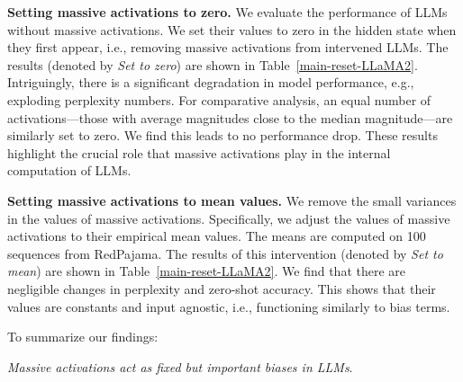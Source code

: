 \documentclass[10pt]{article}
\begin{document}
\textbf{Setting massive activations to zero.} We evaluate the performance of LLMs without massive activations. We set their values to zero in the hidden state when they first appear, i.e., removing massive activations from intervened LLMs. The results (denoted by \textit{Set to zero}) are shown in Table~\ref{main-reset-LLaMA2}. Intriguingly, there is a significant degradation in model performance, e.g., exploding perplexity numbers. For comparative analysis, an equal number of activations---those with average magnitudes close to the median magnitude---are similarly set to zero. We find this leads to no performance drop. These results highlight the crucial role that massive activations play  in the internal computation of LLMs. 



\textbf{Setting massive activations to mean values.} We remove the small variances in the values of massive activations. Specifically, we adjust the values of massive activations to their empirical mean values. The means are computed on 100 sequences from RedPajama. The results of this intervention (denoted by \textit{Set to mean}) are shown in Table~\ref{main-reset-LLaMA2}. We find that there are negligible changes in perplexity and zero-shot accuracy. This shows that their values are constants and input agnostic, i.e., functioning similarly to bias terms.

To summarize our findings:
\begin{center}
    \textit{Massive activations act as fixed but important biases in LLMs}. 
\end{center}
\end{document}
